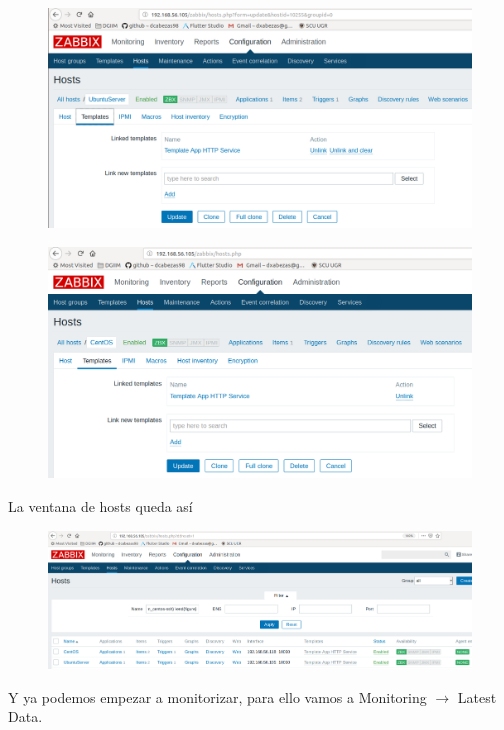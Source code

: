 \documentclass{article}
\begin{document}
\begin{figure}[H]
  \centering
  \includegraphics[width=120mm]{screenshots/item_us-http}
\end{figure}

\begin{figure}[H]
  \centering
  \includegraphics[width=120mm]{screenshots/item_centos-http}
\end{figure}

La ventana de hosts queda así

\begin{figure}[H]
  \centering
  \includegraphics[width=160mm]{screenshots/hosts}
\end{figure}

Y ya podemos empezar a monitorizar, para ello vamos a Monitoring $\rightarrow$ Latest Data.
\end{document}
